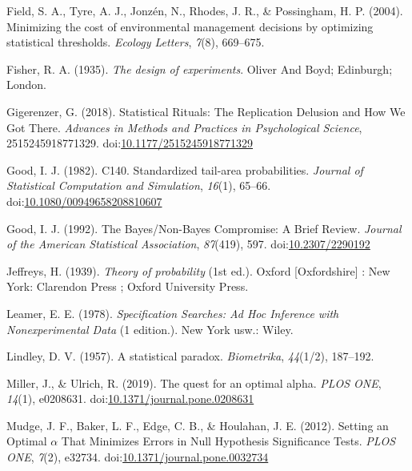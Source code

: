 \documentclass[,jou,floatsintext]{apa6}
\begin{document}
\leavevmode\hypertarget{ref-field_minimizing_2004}{}%
Field, S. A., Tyre, A. J., Jonzén, N., Rhodes, J. R., \& Possingham, H. P. (2004). Minimizing the cost of environmental management decisions by optimizing statistical thresholds. \emph{Ecology Letters}, \emph{7}(8), 669--675.

\leavevmode\hypertarget{ref-fisher_design_1935}{}%
Fisher, R. A. (1935). \emph{The design of experiments}. Oliver And Boyd; Edinburgh; London.

\leavevmode\hypertarget{ref-gigerenzer_statistical_2018}{}%
Gigerenzer, G. (2018). Statistical Rituals: The Replication Delusion and How We Got There. \emph{Advances in Methods and Practices in Psychological Science}, 2515245918771329. doi:\href{https://doi.org/10.1177/2515245918771329}{10.1177/2515245918771329}

\leavevmode\hypertarget{ref-good_c140._1982}{}%
Good, I. J. (1982). C140. Standardized tail-area probabilities. \emph{Journal of Statistical Computation and Simulation}, \emph{16}(1), 65--66. doi:\href{https://doi.org/10.1080/00949658208810607}{10.1080/00949658208810607}

\leavevmode\hypertarget{ref-good_bayesux2fnon-bayes_1992}{}%
Good, I. J. (1992). The Bayes/Non-Bayes Compromise: A Brief Review. \emph{Journal of the American Statistical Association}, \emph{87}(419), 597. doi:\href{https://doi.org/10.2307/2290192}{10.2307/2290192}

\leavevmode\hypertarget{ref-jeffreys_theory_1939}{}%
Jeffreys, H. (1939). \emph{Theory of probability} (1st ed.). Oxford {[}Oxfordshire{]} : New York: Clarendon Press ; Oxford University Press.

\leavevmode\hypertarget{ref-leamer_specification_1978}{}%
Leamer, E. E. (1978). \emph{Specification Searches: Ad Hoc Inference with Nonexperimental Data} (1 edition.). New York usw.: Wiley.

\leavevmode\hypertarget{ref-lindley_statistical_1957}{}%
Lindley, D. V. (1957). A statistical paradox. \emph{Biometrika}, \emph{44}(1/2), 187--192.

\leavevmode\hypertarget{ref-miller_quest_2019}{}%
Miller, J., \& Ulrich, R. (2019). The quest for an optimal alpha. \emph{PLOS ONE}, \emph{14}(1), e0208631. doi:\href{https://doi.org/10.1371/journal.pone.0208631}{10.1371/journal.pone.0208631}

\leavevmode\hypertarget{ref-mudge_setting_2012}{}%
Mudge, J. F., Baker, L. F., Edge, C. B., \& Houlahan, J. E. (2012). Setting an Optimal \(\alpha\) That Minimizes Errors in Null Hypothesis Significance Tests. \emph{PLOS ONE}, \emph{7}(2), e32734. doi:\href{https://doi.org/10.1371/journal.pone.0032734}{10.1371/journal.pone.0032734}
\end{document}
